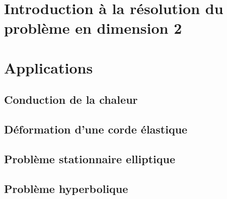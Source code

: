 \documentclass[11pt]{article}
\begin{document}
\section{Introduction à la résolution du problème en dimension 2}


\section{Applications}

\subsection{Conduction de la chaleur}

\subsection{Déformation d'une corde élastique}

\subsection{Problème stationnaire elliptique}

\subsection{Problème hyperbolique}
\end{document}
